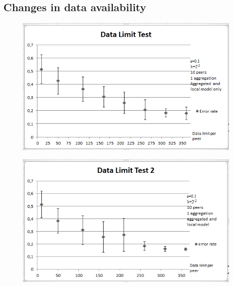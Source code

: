 \subsection{Changes in data availability}
\begin{figure}[H]
	\centering
	\begin{minipage}{.65\linewidth}
		\includegraphics[width=\linewidth]{fig/spambase/data_limit_test_withoutlocalmodel}
		\label{fig:data_limit_test_withoutlocalmodel}
	\end{minipage}
	\hspace{1mm}
	\begin{minipage}{.65\linewidth}
		\includegraphics[width=\linewidth]{fig/spambase/data_limit_test_withlocalmodel}
		\label{fig:data_limit_test_withlocalmodel}
	\end{minipage}

\end{figure}
